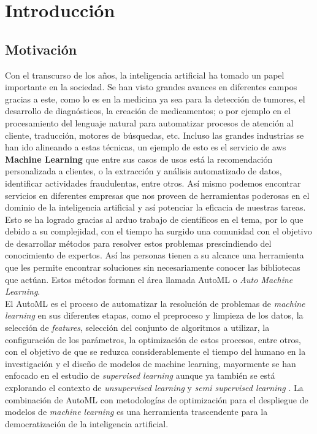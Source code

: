 \chapter*{Introducción}\label{chapter:introduction}

\section*{Motivación}
Con el transcurso de los años, la inteligencia artificial ha tomado un papel importante en la sociedad. Se han visto grandes avances en diferentes campos gracias a este, como lo es en la medicina ya sea para la detección de tumores, el desarrollo de diagnósticos, la creación de medicamentos; o por ejemplo en el procesamiento del lenguaje natural para automatizar procesos de atención al cliente, traducción, motores de búsquedas, etc. Incluso las grandes industrias se han ido alineando a estas técnicas, un ejemplo de esto es el servicio de aws \textbf{Machine Learning} que entre sus casos de usos está la recomendación personalizada a clientes, o la extracción y análisis automatizado de datos, identificar actividades fraudulentas, entre otros. Así mismo podemos encontrar servicios en diferentes empresas que nos proveen de herramientas poderosas en el dominio de la inteligencia artificial y así potenciar la eficacia de nuestras tareas. Esto se ha logrado gracias al arduo trabajo de científicos en el tema, por lo que debido a su complejidad, con el tiempo ha surgido una comunidad con el objetivo de desarrollar métodos para resolver estos problemas prescindiendo del conocimiento de expertos. Así las personas tienen a su alcance una herramienta que les permite encontrar soluciones sin necesariamente conocer las bibliotecas que actúan. Estos métodos forman el área llamada AutoML o \textit{Auto Machine Learning}.\\

El AutoML \parencite{71} es el proceso de automatizar la resolución de problemas de \textit{machine learning} en sus diferentes etapas, como el preproceso y limpieza de los datos, la selección de \textit{features}, selección del conjunto de algoritmos a utilizar, la configuración de los parámetros, la optimización de estos procesos, entre otros, con el objetivo de que se reduzca considerablemente el tiempo del humano en la investigación y el diseño de modelos de machine learning, mayormente se han enfocado en el estudio de \textit{supervised learning} aunque ya también se está explorando el contexto de \textit{unsupervised learning} \parencite{1} y \textit{semi supervised learning} \parencite{2}. La combinación de AutoML con metodologías de optimización para el despliegue de modelos de \textit{machine learning} es una herramienta trascendente para la democratización de la inteligencia artificial.\\

